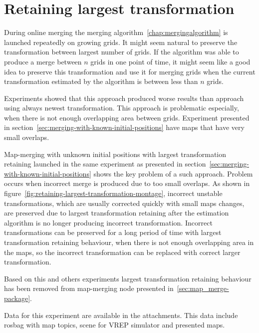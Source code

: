 \section{Retaining largest transformation}
\label{sec:retaining-largest-transformation}

During online merging the merging algorithm~\ref{chap:mergingalgorithm} is launched repeatedly on growing grids. It might seem natural to preserve the transformation between largest number of grids. If the algorithm was able to produce a merge between $n$ grids in one point of time, it might seem like a good idea to preserve this transformation and use it for merging grids when the current transformation estimated by the algorithm is between less than $n$ grids.

Experiments showed that this approach produced worse results than approach using always newest transformation. This approach is problematic especially, when there is not enough overlapping area between grids. Experiment presented in section~\ref{sec:merging-with-known-initial-positions} have maps that have very small overlaps.

Map-merging with unknown initial positions with largest transformation retaining launched in the same experiment as presented in section~\ref{sec:merging-with-known-initial-positions} shows the key problem of a such approach. Problem occurs when incorrect merge is produced due to too small overlaps. As shown in figure~\ref{fig:retaining-largest-transformation-montage}, incorrect unstable transformations, which are usually corrected quickly with small maps changes, are preserved due to largest transformation retaining after the estimation algorithm is no longer producing incorrect transformation. Incorrect transformations can be preserved for a long period of time with largest transformation retaining behaviour, when there is not enough overlapping area in the maps, so the incorrect transformation can be replaced with correct larger transformation.

Based on this and others experiments largest transformation retaining behaviour has been removed from map-merging node presented in~\ref{sec:map_merge-package}.

Data for this experiment are available in the attachments. This data include rosbag with map topics, scene for \gls{VREP} simulator and presented maps.

